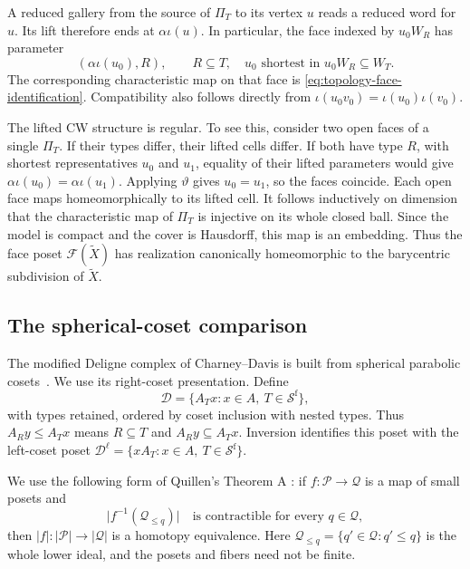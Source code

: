 A reduced gallery from the source of $\Pi_T$ to its vertex $u$ reads
a reduced word for $u$.  Its lift therefore ends at $\alpha\iota(u)$.
In particular, the face indexed by $u_0W_R$ has parameter
\begin{equation}
  (\alpha\iota(u_0),R),
  \qquad R\subseteq T,
  \quad u_0\text{ shortest in }u_0W_R\subseteq W_T.
  \label{eq:topology-lifted-faces}
\end{equation}
The corresponding characteristic map on that face is
\eqref{eq:topology-face-identification}.  Compatibility also follows
directly from
$\iota(u_0v_0)=\iota(u_0)\iota(v_0)$.

The lifted CW structure is regular.  To see this, consider two open
faces of a single $\Pi_T$.  If their types differ, their lifted cells
differ.  If both have type $R$, with shortest representatives $u_0$
and $u_1$, equality of their lifted parameters would give
$\alpha\iota(u_0)=\alpha\iota(u_1)$.  Applying $\vartheta$ gives
$u_0=u_1$, so the faces coincide.  Each open face maps
homeomorphically to its lifted cell.  It follows inductively on
dimension that the characteristic map of $\Pi_T$ is injective on its
whole closed ball.  Since the model is compact and the cover is
Hausdorff, this map is an embedding.  Thus the face poset
$\mathcal F(\widetilde X)$ has realization canonically homeomorphic
to the barycentric subdivision of $\widetilde X$.

\subsection{The spherical-coset comparison}

The modified Deligne complex of Charney--Davis is built from spherical
parabolic cosets~\cite[Section~1.5]{CharneyDavis1995}.  We use its
right-coset presentation.  Define
\begin{equation}
  \mathcal D
  =\{A_Tx:x\in A,\ T\in\mathcal S^{\mathrm f}\},
  \label{eq:topology-deligne-poset}
\end{equation}
with types retained, ordered by coset inclusion with nested types.
Thus $A_Ry\le A_Tx$ means $R\subseteq T$ and
$A_Ry\subseteq A_Tx$.  Inversion identifies this poset with the
left-coset poset
$\mathcal D^{\ell}=\{xA_T:x\in A,\ T\in\mathcal S^{\mathrm f}\}$.

We use the following form of Quillen's Theorem A
\cite[Section 1, Theorem A and its dual formulation]{Quillen1973}:
if $f\colon\mathcal P\to\mathcal Q$ is a map of small posets and
\[
  \bigl|f^{-1}(\mathcal Q_{\le q})\bigr|
  \quad\text{is contractible for every }q\in\mathcal Q,
\]
then $|f|\colon|\mathcal P|\to|\mathcal Q|$ is a homotopy equivalence.
Here $\mathcal Q_{\le q}=\{q'\in\mathcal Q:q'\le q\}$ is the whole
lower ideal, and the posets and fibers need not be finite.

